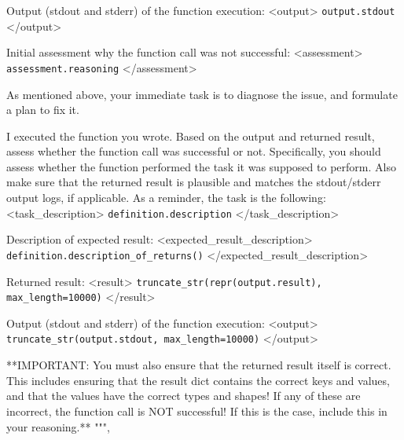 \begin{tcolorbox}[title={\texttt{Diagnose User Instructions}}]
Output (stdout and stderr) of the function execution:
<output>
\texttt{{output.stdout}}
</output>

Initial assessment why the function call was not successful:
<assessment>
\texttt{{assessment.reasoning}}
</assessment>

As mentioned above, your immediate task is to diagnose the issue, and formulate a plan to fix it.
\end{tcolorbox}



\begin{tcolorbox}[title={\texttt{Function Execution Assessment User Instructions}}]
I executed the function you wrote.
Based on the output and returned result, assess whether the function call was successful or not.
Specifically, you should assess whether the function performed the task it was supposed to perform.
Also make sure that the returned result is plausible and matches the stdout/stderr output logs, if applicable.
As a reminder, the task is the following:
<task\_description>
\texttt{{definition.description}}
</task\_description>

Description of expected result:
<expected\_result\_description>
\texttt{{definition.description\_of\_returns()}}
</expected\_result\_description>

Returned result:
<result>
\texttt{{truncate\_str(repr(output.result), max\_length=10000)}}
</result>

Output (stdout and stderr) of the function execution:
<output>
\texttt{{truncate\_str(output.stdout, max\_length=10000)}}
</output>

**IMPORTANT: You must also ensure that the returned result itself is correct. This includes ensuring that the result dict contains the correct keys and values, and that the values have the correct types and shapes! If any of these are incorrect, the function call is NOT successful! If this is the case, include this in your reasoning.**
""",
\end{tcolorbox}

